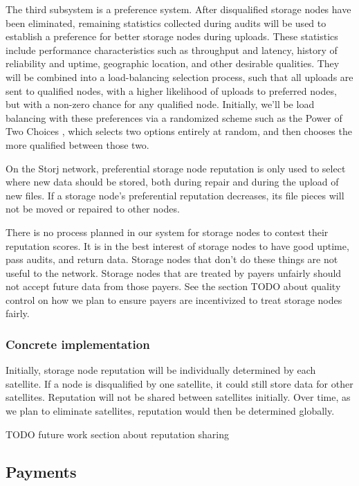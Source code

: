 \documentclass[a4paper,10pt]{article} \usepackage[utf8]{inputenc}
\newcommand{\todo}[1]{{\color{red} TODO #1 }}
\begin{document}
The third subsystem is a preference system. After disqualified storage nodes
have been eliminated, remaining statistics collected during audits
will be used to establish a preference for better storage nodes during uploads.
These statistics include performance characteristics such as throughput and
latency, history of reliability and uptime, geographic location, and other
desirable qualities.
They will be combined into a load-balancing selection process, such
that all uploads are sent to qualified nodes, with a higher likelihood of
uploads to preferred nodes, but with a non-zero chance for any qualified node.
Initially, we'll be load balancing with these preferences via a randomized
scheme such as the Power of Two Choices \cite{power-of-two-choices}, which
selects two options entirely at random, and then chooses the more qualified
between those two.

On the Storj network, preferential storage node reputation is only used to
select where new data should be stored, both during repair and during the
upload of new files.
If a storage node's preferential reputation decreases, its file pieces will not
be moved or repaired to other nodes.

There is no process planned in our system for storage nodes to contest their
reputation scores. It is in the best interest of storage nodes to have good
uptime, pass audits, and return data. Storage nodes that don't do these things
are not useful to the network. Storage nodes that are treated by payers unfairly
should not accept future data from those payers. See the section \todo{} about
quality control on how we plan to ensure payers are incentivized to treat
storage nodes fairly.

\subsubsection{Concrete implementation}

Initially, storage node reputation will be individually determined by each
satellite. If a node is disqualified by one satellite, it could still
store data for other satellites. Reputation will not be shared between
satellites initially. Over time, as we plan to eliminate satellites,
reputation would then be determined globally.

\todo{future work section about reputation sharing}

\subsection{Payments}
\end{document}
